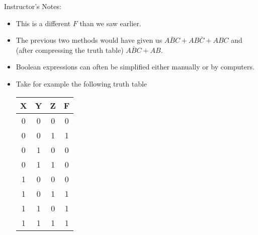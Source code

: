 \begin{frame}[fragile]
\BNotes\ifnum{}
Instructor's Notes:
\begin{itemize}
\item This is a different $F$ than we saw earlier.
\item The previous two methods would have given us $A\bar B C + A B \bar C +
A B C$ and (after compressing the truth table) $A \bar B C + AB$.
\end{itemize}
\ENotes\fi
\end{frame}





\begin{frame}[fragile]
\begin{itemize}
    \item Boolean expressions can often be simplified either manually or by computers.
    \item Take for example the following truth table 
\begin{multicols}{2}
 \begin{center}
	{\footnotesize
 \begin{tabular}{ccc|c}
		X&Y&Z & F \\\hline
		0&0&0 & 0  \\
		0&0&1 & 1 \\
		0&1&0 & 0  \\
		0&1&1 & 0 \\
		1&0&0 & 0  \\
		1&0&1 & 1 \\
		1&1&0 & 1  \\
		1&1&1 & 1 \\
		\end{tabular}
  }
		\end{center}	
  \columnbreak


\end{multicols}
\end{itemize}
\end{frame}
